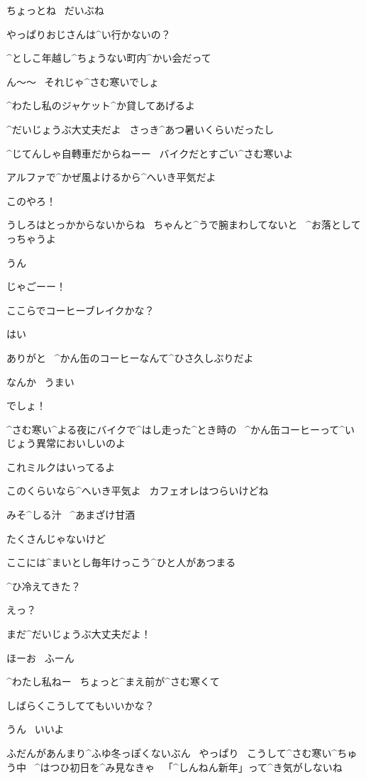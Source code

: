 \A ちょっとね
\ だいぶね

\A やっぱりおじさんは^{い}{行}かないの？

\T ^{としこ}{年越}し^{ちょうない}{町内}^{かい}{会}だって

\page
\A ん〜〜
\ それじゃ^{さむ}{寒}いでしょ

\A ^{わたし}{私}のジャケット^{か}{貸}してあげるよ

\T ^{だいじょうぶ}{大丈夫}だよ
\ さっき^{あつ}{暑}いくらいだったし

\A ^{じてんしゃ}{自轉車}だからねーー
\ バイクだとすごい^{さむ}{寒}いよ

\T アルファで^{かぜ}{風}よけるから^{へいき}{平気}だよ

\page
\A このやろ！

\A うしろはとっかからないからね
\ ちゃんと^{うで}{腕}まわしてないと
\ ^{お}{落}としてっちゃうよ

\T うん

\T じゃごーー！

\page[122]
\A ここらでコーヒーブレイクかな？

\A はい

\T ありがと
\ ^{かん}{缶}のコーヒーなんて^{ひさ}{久}しぶりだよ

\page
\T なんか
\ うまい

\A でしょ！

\A ^{さむ}{寒}い^{よる}{夜}にバイクで^{はし}{走}った^{とき}{時}の
\ ^{かん}{缶}コーヒーって^{いじょう}{異常}においしいのよ

\T これミルクはいってるよ

\A このくらいなら^{へいき}{平気}よ
\ カフェオレはつらいけどね

\page
\Sign みそ^{しる}{汁}
\ ^{あまざけ}{甘酒}

\page
\A たくさんじゃないけど

\A ここには^{まいとし}{毎年}けっこう^{ひと}{人}があつまる

\A ^{ひ}{冷}えてきた？

\T えっ？

\T まだ^{だいじょうぶ}{大丈夫}だよ！

\A ほーお
\ ふーん

\A ^{わたし}{私}ねー
\ ちょっと^{まえ}{前}が^{さむ}{寒}くて

\page
\A しばらくこうしててもいいかな？

\T うん
\ いいよ

\page
\A ふだんがあんまり^{ふゆ}{冬}っぽくないぶん
\ やっぱり
\ こうして^{さむ}{寒}い^{ちゅう}{中}
\ ^{はつひ}{初日}を^{み}{見}なきゃ
\ 「^{しんねん}{新年}」って^{き}{気}がしないね

